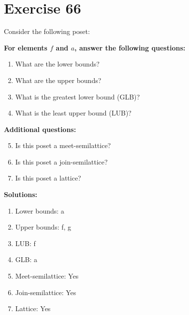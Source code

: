 \documentclass{article}
\begin{document}
\section*{Exercise 66}
Consider the following poset:
\begin{center}
\end{center}

    \textbf{For elements $f$ and $a$, answer the following questions:}
\begin{enumerate}
    \item What are the lower bounds?
    \item What are the upper bounds?
    \item What is the greatest lower bound (GLB)?
    \item What is the least upper bound (LUB)?
\end{enumerate}
    \hspace*{3ex} \textbf{Additional questions:}
\begin{enumerate}
    \setcounter{enumi}{4}
    \item Is this poset a meet-semilattice?
    \item Is this poset a join-semilattice?
    \item Is this poset a lattice?
\end{enumerate}

\textbf{Solutions:}
\begin{enumerate}
    \item Lower bounds: {a}
    \item Upper bounds: {f, g}
    \item LUB: f
    \item GLB: a
    \item Meet-semilattice: Yes
    \item Join-semilattice: Yes
    \item Lattice: Yes
\end{enumerate}
\newpage
\end{document}
